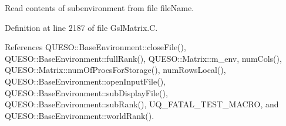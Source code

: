 Read contents of subenvironment from file {\ttfamily file\-Name}. 



Definition at line 2187 of file Gsl\-Matrix.\-C.



References Q\-U\-E\-S\-O\-::\-Base\-Environment\-::close\-File(), Q\-U\-E\-S\-O\-::\-Base\-Environment\-::full\-Rank(), Q\-U\-E\-S\-O\-::\-Matrix\-::m\-\_\-env, num\-Cols(), Q\-U\-E\-S\-O\-::\-Matrix\-::num\-Of\-Procs\-For\-Storage(), num\-Rows\-Local(), Q\-U\-E\-S\-O\-::\-Base\-Environment\-::open\-Input\-File(), Q\-U\-E\-S\-O\-::\-Base\-Environment\-::sub\-Display\-File(), Q\-U\-E\-S\-O\-::\-Base\-Environment\-::sub\-Rank(), U\-Q\-\_\-\-F\-A\-T\-A\-L\-\_\-\-T\-E\-S\-T\-\_\-\-M\-A\-C\-R\-O, and Q\-U\-E\-S\-O\-::\-Base\-Environment\-::world\-Rank().


